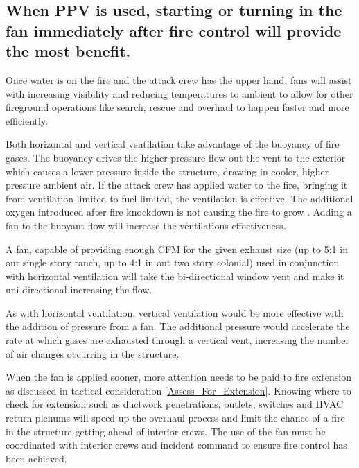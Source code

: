 \documentclass{article}
\begin{document}
\subsection{When PPV is used, starting or turning in the fan immediately after fire control will provide the most benefit.}  
Once water is on the fire and the attack crew has the upper hand, fans will assist with increasing visibility and reducing temperatures to ambient to allow for other fireground operations like search, rescue and overhaul to happen faster and more efficiently.  

Both horizontal and vertical ventilation take advantage of the buoyancy of fire gases. The buoyancy drives the higher pressure flow out the vent to the exterior which causes a lower pressure inside the structure, drawing in cooler, higher pressure ambient air. If the attack crew has applied water to the fire, bringing it from ventilation limited to fuel limited, the ventilation is effective. The additional oxygen introduced after fire knockdown is not causing the fire to grow \cite{DHS2008} \cite{DHS2010}. Adding a fan to the buoyant flow will increase the ventilations effectiveness. 

A fan, capable of providing enough CFM for the given exhaust size (up to 5:1 in our single story ranch, up to 4:1 in out two story colonial) used in conjunction with horizontal ventilation will take the bi-directional window vent and make it uni-directional increasing the flow.

As with horizontal ventilation, vertical ventilation would be more effective with the addition of pressure from a fan. The additional pressure would accelerate the rate at which gases are exhausted through a vertical vent, increasing the number of air changes occurring in the structure.

When the fan is applied sooner, more attention needs to be paid to fire extension as discussed in tactical consideration \ref{Assess_For_Extension}. Knowing where to check for extension such as ductwork penetrations, outlets, switches and HVAC return plenums will speed up the overhaul process and limit the chance of a fire in the structure getting ahead of interior crews.  The use of the fan must be coordinated with interior crews and incident command to ensure fire control has been achieved.  

\newpage

\glsaddall
\printglossary[nonumberlist]
\newpage

\printbibliography
\end{document}
